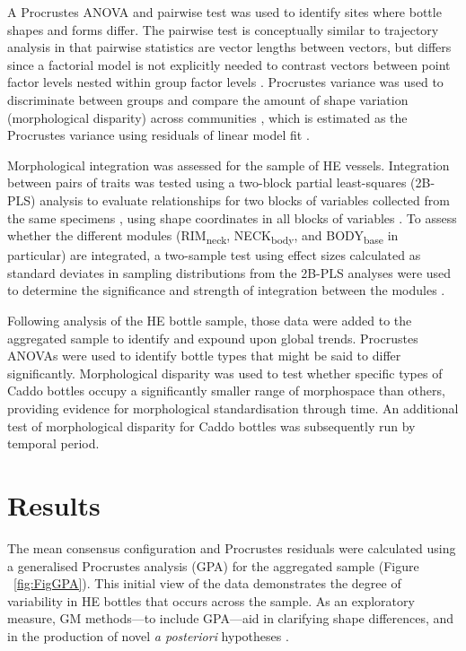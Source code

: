 \documentclass[review]{elsarticle}
\begin{document}
A Procrustes ANOVA and pairwise test was used to identify sites where bottle shapes and forms differ. The pairwise test is conceptually similar to trajectory analysis \citep{RN11573,RN1648,RN1776,RN1739} in that pairwise statistics are vector lengths between vectors, but differs since a factorial model is not explicitly needed to contrast vectors between point factor levels nested within group factor levels \citep{RN11530}. Procrustes variance was used to discriminate between groups and compare the amount of shape variation (morphological disparity) across communities \citep{RN11560}, which is estimated as the Procrustes variance using residuals of linear model fit \citep{RN11530}. 

Morphological integration was assessed for the sample of HE vessels. Integration between pairs of traits was tested using a two-block partial least-squares (2B-PLS) analysis to evaluate relationships for two blocks of variables collected from the same specimens \citep{RN11615,RN11613,RN11614}, using shape coordinates in all blocks of variables \citep{RN11616,RN11615,RN11617}. To assess whether the different modules (RIM\textsubscript{neck}, NECK\textsubscript{body}, and BODY\textsubscript{base} in particular) are integrated, a two-sample test using effect sizes calculated as standard deviates in sampling distributions from the 2B-PLS analyses were used to determine the significance and strength of integration between the modules \citep{RN11700}. 

Following analysis of the HE bottle sample, those data were added to the aggregated sample to identify and expound upon global trends. Procrustes ANOVAs were used to identify bottle types that might be said to differ significantly. Morphological disparity was used to test whether specific types of Caddo bottles occupy a significantly smaller range of morphospace than others, providing evidence for morphological standardisation through time. An additional test of morphological disparity for Caddo bottles was subsequently run by temporal period.

\section{Results}

The mean consensus configuration and Procrustes residuals were calculated using a generalised Procrustes analysis (GPA) for the aggregated sample \citep[Figure 3]{RN1720} (Figure ~\ref{fig:FigGPA}). This initial view of the data demonstrates the degree of variability in HE bottles that occurs across the sample. As an exploratory measure, GM methods---to include GPA---aid in clarifying shape differences, and in the production of novel \textit{a posteriori} hypotheses \citep{RN1720}.
\end{document}
